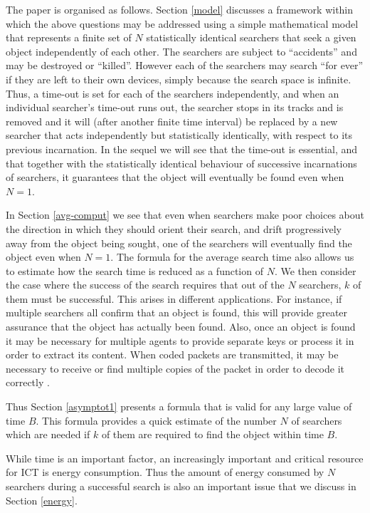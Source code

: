 \documentclass[journal]{IEEEtran}
\begin{document}
The paper is organised as follows. Section \ref{model} discusses a framework within which the above questions may be addressed using a simple mathematical model that represents a finite set of $N$ statistically identical searchers that seek a given object independently of each other. The  searchers are subject to ``accidents''  and
may be destroyed or ``killed''. However each of the searchers may search  ``for ever'' if they are left to their own devices, simply because the search space is infinite. Thus, a time-out is set for each of the searchers independently, and when an individual searcher's time-out runs out, the searcher
stops in its tracks and is removed and it will
(after another finite time interval) be replaced by a new searcher that acts independently but statistically identically, with respect to its previous incarnation. In the sequel we will see that the time-out is essential, and that together with the statistically identical behaviour of successive incarnations of searchers, it guarantees that the object will eventually be found even when $N=1$.


In Section \ref{avg-comput} we  see that even when searchers make poor choices
about the direction in which they should orient their search, and
drift progressively away from the object being sought, one of the searchers will eventually find the object even when $N=1$. The formula for the average search time also allows us to estimate how the search time is reduced as a function of $N$.
We then consider the case where the success of the search requires that out of the $N$ searchers, $k$ of them must be successful.
This arises in different applications. For instance,  if multiple searchers all confirm that an object is found, this will provide greater assurance that the object  has actually been found. Also, once an object is found it may be necessary for multiple agents to provide separate keys
or process it in order to extract its content.
When coded packets are transmitted, it may be necessary to receive or find multiple copies of the
packet in order to decode it correctly \cite{Wang05}.

Thus Section \ref{asymptot1} presents a
formula that is valid for any large value of time $B$. This formula provides a quick estimate of the number $N$ of searchers which are needed if $k$ of them
are required to find the object within time $B$.

While time is an important factor, an increasingly important  and critical resource for ICT  is energy consumption. Thus the amount
of energy consumed by $N$ searchers during a successful search is also an important issue that we discuss in Section \ref{energy}.
\end{document}
